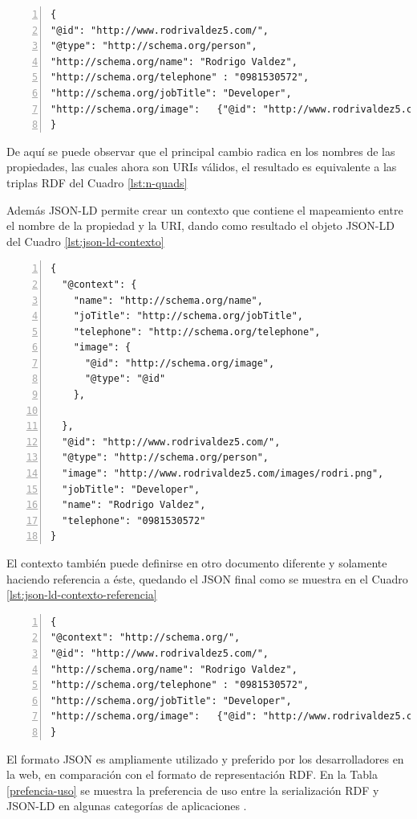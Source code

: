 \noindent\begin{minipage}{\textwidth}
\begin{lstlisting}[captionpos=b, caption=Ejemplo de un documento JSON-LD, label=lst:json-ld,  numbers=left,  numberstyle=\tiny\color{mygray},
    basicstyle=\tiny,frame=single]
{
"@id": "http://www.rodrivaldez5.com/",
"@type": "http://schema.org/person",
"http://schema.org/name": "Rodrigo Valdez",
"http://schema.org/telephone" : "0981530572",
"http://schema.org/jobTitle": "Developer",
"http://schema.org/image":   {"@id": "http://www.rodrivaldez5.com/images/rodri.png"} 
}
\end{lstlisting}
\end{minipage}
De aquí se puede observar que el principal cambio radica en los nombres de las propiedades, las cuales ahora son URIs válidos, el resultado es equivalente a las triplas RDF del Cuadro \ref{lst:n-quads}

Además JSON-LD permite crear un contexto que contiene el mapeamiento entre el nombre de la propiedad y la URI, dando como resultado el objeto JSON-LD del Cuadro \ref{lst:json-ld-contexto}

\begin{lstlisting}[captionpos=b, caption=Ejemplo de un documento JSON-LD con Contexto, label=lst:json-ld-contexto,  numbers=left,  numberstyle=\tiny\color{mygray},
    basicstyle=\tiny,frame=single]
{
  "@context": {
    "name": "http://schema.org/name",  
    "joTitle": "http://schema.org/jobTitle",  
    "telephone": "http://schema.org/telephone",  
    "image": {
      "@id": "http://schema.org/image",  
      "@type": "@id"  
    },
  
  },
  "@id": "http://www.rodrivaldez5.com/",
  "@type": "http://schema.org/person",
  "image": "http://www.rodrivaldez5.com/images/rodri.png",
  "jobTitle": "Developer",
  "name": "Rodrigo Valdez",
  "telephone": "0981530572"
}
\end{lstlisting}

El contexto también puede definirse en otro documento diferente y solamente haciendo referencia a éste, quedando el JSON final como se muestra en el Cuadro \ref{lst:json-ld-contexto-referencia}

\noindent\begin{minipage}{\textwidth}
\begin{lstlisting}[captionpos=b, caption=Ejemplo de un documento JSON-LD con Contexto referenciado, label=lst:json-ld-contexto-referencia,  numbers=left,  numberstyle=\tiny\color{mygray},
    basicstyle=\tiny,frame=single]
{
"@context": "http://schema.org/",
"@id": "http://www.rodrivaldez5.com/",
"http://schema.org/name": "Rodrigo Valdez",
"http://schema.org/telephone" : "0981530572",
"http://schema.org/jobTitle": "Developer",
"http://schema.org/image":   {"@id": "http://www.rodrivaldez5.com/images/rodri.png"} 
}
\end{lstlisting}
\end{minipage}
El formato JSON es ampliamente utilizado y preferido por los desarrolladores en la web, en comparación con el formato de representación RDF. En la Tabla \ref{prefencia-uso} se muestra la preferencia de uso entre la serialización RDF y JSON-LD en algunas categorías de aplicaciones \cite{rdfjson}.

